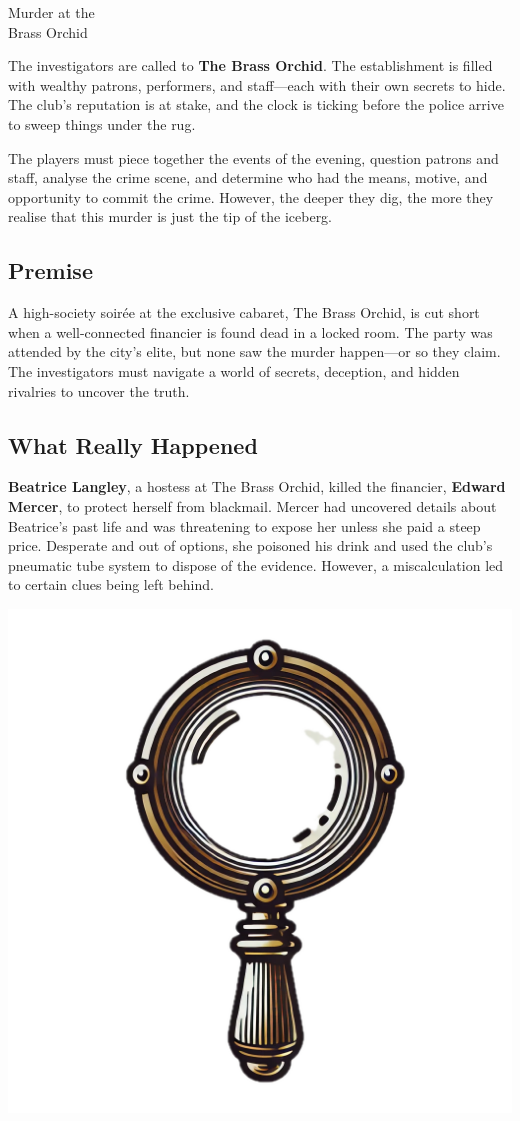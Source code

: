 
\begin{WyrdScenarioHeading}{Murder at the\\Brass Orchid}
	\label{scenario:murder-at-the-brass-orchid}
	
	The investigators are called to \textbf{The Brass Orchid}. The establishment is filled with wealthy patrons, performers, and staff—each with their own secrets to hide. The club’s reputation is at stake, and the clock is ticking before the police arrive to sweep things under the rug.

	The players must piece together the events of the evening, question patrons and staff, analyse the crime scene, and determine who had the means, motive, and opportunity to commit the crime. However, the deeper they dig, the more they realise that this murder is just the tip of the iceberg.

	\subsection*{Premise} 
	A high-society soirée at the exclusive cabaret, The Brass Orchid, is cut short when a well-connected financier is found dead in a locked room. The party was attended by the city's elite, but none saw the murder happen—or so they claim. The investigators must navigate a world of secrets, deception, and hidden rivalries to uncover the truth.

	\subsection*{What Really Happened} 
	\textbf{Beatrice Langley}, a hostess at The Brass Orchid, killed the financier, \textbf{Edward Mercer}, to protect herself from blackmail. Mercer had uncovered details about Beatrice’s past life and was threatening to expose her unless she paid a steep price. Desperate and out of options, she poisoned his drink and used the club’s pneumatic tube system to dispose of the evidence. However, a miscalculation led to certain clues being left behind.
\end{WyrdScenarioHeading}

\begin{center}
	\includegraphics[width=.5\linewidth]{img/separt/detective-glass}
\end{center}

